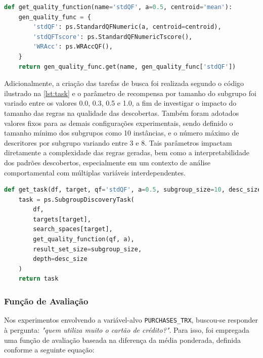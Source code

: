\documentclass[12pt]{article}
\begin{document}
\begin{center}
    \begin{lstlisting}[language=Python, caption={Função auxiliar para seleção da métrica de qualidade utilizada em cada experimento.}, label={lst:qualityfunc}]
def get_quality_function(name='stdQF', a=0.5, centroid='mean'):
    gen_quality_func = {
        'stdQF': ps.StandardQFNumeric(a, centroid=centroid),
        'stdQFTscore': ps.StandardQFNumericTscore(),
        'WRAcc': ps.WRAccQF(),
    }
    return gen_quality_func.get(name, gen_quality_func['stdQF'])
\end{lstlisting}
\end{center}

Adicionalmente, a criação das tarefas de busca foi realizada segundo o código ilustrado na \autoref{lst:task} e o parâmetro de recompensa por tamanho do subgrupo foi variado entre os valores 0.0, 0.3, 0.5 e 1.0, a fim de investigar o impacto do tamanho das regras na qualidade das descobertas. Também foram adotados valores fixos para as demais configurações experimentais, sendo definido o tamanho mínimo dos subgrupos como 10 instâncias, e o número máximo de descritores por subgrupo variando entre 3 e 8. Tais parâmetros impactam diretamente a complexidade das regras geradas, bem como a interpretabilidade dos padrões descobertos, especialmente em um contexto de análise comportamental com múltiplas variáveis interdependentes.

\begin{center}
    \begin{lstlisting}[language=Python, caption={Criação da tarefa de descoberta de subgrupos}, label={lst:task}]
def get_task(df, target, qf='stdQF', a=0.5, subgroup_size=10, desc_size=3):
    task = ps.SubgroupDiscoveryTask(
        df,
        targets[target],
        search_spaces[target],
        get_quality_function(qf, a),
        result_set_size=subgroup_size,
        depth=desc_size
    )
    return task
\end{lstlisting}
\end{center}

\subsubsection{Função de Avaliação}

\hspace{1.2cm}Nos experimentos envolvendo a variável-alvo \texttt{PURCHASES\_TRX}, buscou-se responder à pergunta: \textit{"quem utiliza muito o cartão de crédito?"}. Para isso, foi empregada uma função de avaliação baseada na diferença da média ponderada, definida conforme a seguinte equação:
\end{document}
